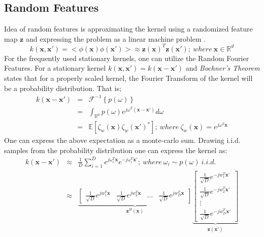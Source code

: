 \documentclass{article}
\begin{document}
\subsection{Random Features}
Idea of random features is approximating the kernel using a randomized feature map $\mathbf{z}$ and expressing the problem as a linear machine problem \cite{randomfeatures}. 
\begin{equation}
k(\mathbf{x},\mathbf{x'})=<\phi(\mathbf{x})\phi(\mathbf{x'})>\approx \mathbf{z}(\mathbf{x})^T\mathbf{z}(\mathbf{x'}); \>where\> \mathbf{x} \in \mathbb{R}^d
\end{equation}
For the frequently used stationary kernels, one can utilize the Random Fourier Features. For a stationary kernel $k(\mathbf{x},\mathbf{x'})=k(\mathbf{x}-\mathbf{x'})$ and \textit{Bochner's Theorem} states that for a properly scaled kernel, the Fourier Transform of the kernel will be a probability distribution. That is; 
\begin{eqnarray}
k(\mathbf{x}-\mathbf{x'})&=&\mathcal{F}^{-1}\left\{p(\omega)\right\} \nonumber \\
&=&\int_{\mathbb{R}^d}p(\omega)e^{j\omega^T(\mathbf{x}-\mathbf{x'})}d\omega \nonumber \\
&=&\mathbb{E}[\zeta_w(\mathbf{x})\zeta_w(\mathbf{x'})^*]; \>where \> \zeta_w(\mathbf{x})=e^{j\omega^T\mathbf{x}}
\end{eqnarray}
One can express the above expectation as a monte-carlo sum. Drawing i.i.d. samples from the probability distribution one can express the kernel as:
\begin{eqnarray}
k(\mathbf{x}-\mathbf{x'})&\approx& \frac{1}{D}\sum_{i=1}^De^{j\omega_i^T\mathbf{x}}e^{-j\omega_i^T\mathbf{x'}}; \> where \> \omega_i\sim p(\omega) \> i.i.d. \nonumber \\
&\approx& \underbrace{\begin{bmatrix}
\frac{1}{\sqrt{D}} e^{jw_1^T\mathbf{x}}& \frac{1}{\sqrt{D}} e^{jw_2^T\mathbf{x}}
& \dots
& \frac{1}{\sqrt{D}} e^{jw_D^T\mathbf{x}}
\end{bmatrix} }_{\mathbf{z}^H(\mathbf{x})}
\underbrace{\begin{bmatrix}
\frac{1}{\sqrt{D}} e^{-jw_1^T\mathbf{x'}}\\ \frac{1}{\sqrt{D}} e^{-jw_2^T\mathbf{x'}}
\\ \vdots
\\ \frac{1}{\sqrt{D}} e^{-jw_D^T\mathbf{x'}}
\end{bmatrix}}_{\mathbf{z}(\mathbf{x'})}
\end{eqnarray}
\end{document}
